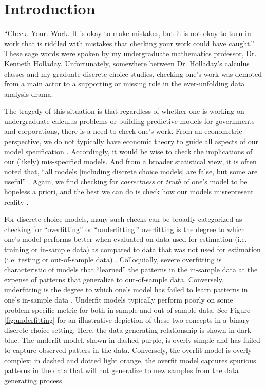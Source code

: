 \documentclass[preprint]{elsarticle}
\begin{document}
\section{Introduction}
\label{sec:intro}
``Check. Your. Work. It is okay to make mistakes, but it is not okay to turn in work that is riddled with mistakes that checking your work could have caught.'' These sage words were spoken by my undergraduate mathematics professor, Dr. Kenneth Holladay. Unfortunately, somewhere between Dr. Holladay's calculus classes and my graduate discrete choice studies, checking one's work was demoted from a main actor to a supporting or missing role in the ever-unfolding data analysis drama.

The tragedy of this situation is that regardless of whether one is working on undergraduate calculus problems or building predictive models for governments and corporations, there is a need to check one's work. From an econometric perspective, we do not typically have economic theory to guide all aspects of our model specification \citep[p.85]{dagsvik_2017_invariance}. Accordingly, it would be wise to check the implications of our (likely) mis-specified models. And from a broader statistical view, it is often noted that, ``all models [including discrete choice models] are false, but some are useful'' \citep{box_science_1976}. Again, we find checking for \textit{correctness} or \textit{truth} of one's model to be hopeless a priori, and the best we can do is check how our models misrepresent reality \citep[pp.734, 800]{gelman_posterior_1996}.

For discrete choice models, many such checks can be broadly categorized as checking for ``overfitting'' or ``underfitting.'' overfitting is the degree to which one's model performs better when evaluated on data used for estimation (i.e. training or in-sample data) as compared to data that was not used for estimation (i.e. testing or out-of-sample data) \citep[p.6]{fariss_enhancing_2017}. Colloquially, severe overfitting is characteristic of models that ``learned'' the patterns in the in-sample data at the expense of patterns that generalize to out-of-sample data. Conversely, underfitting is the degree to which one's model has failed to learn patterns in one's in-sample data \citep[p.6]{fariss_enhancing_2017}. Underfit models typically perform poorly on some problem-specific metric for both in-sample and out-of-sample data. See Figure \ref{fig:underfitting} for an illustrative depiction of these two concepts in a binary discrete choice setting. Here, the data generating relationship is shown in dark blue. The underfit model, shown in dashed purple, is overly simple and has failed to capture observed patters in the data. Conversely, the overfit model is overly complex; in dashed and dotted light orange, the overfit model captures spurious patterns in the data that will not generalize to new samples from the data generating process.
\end{document}
